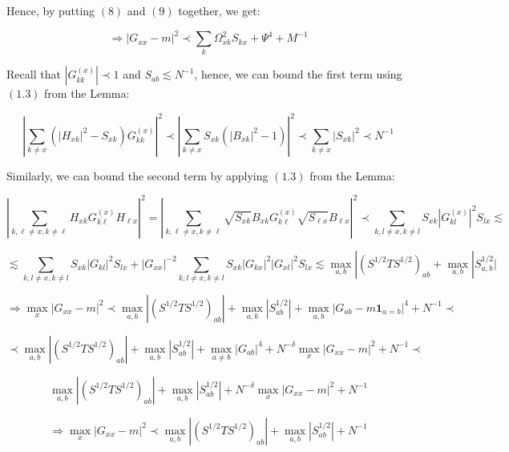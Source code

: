 \documentclass[11pt]{article}
\begin{document}
Hence, by putting $(8)$ and $(9)$ together, we get:

\begin{equation*}\Rightarrow |G_{xx}-m|^2\prec \sum_{k}\Omega_{xk}^2S_{kx}+\Psi^4 + M^{-1}\tag{10}\end{equation*}

Recall that $|G_{kk}^{(x)}|\prec 1$ and $S_{ab}\lesssim N^{-1}$, hence, we can bound the first term using $(1.3)$ from the Lemma:

$$\left\vert\sum_{k\neq x}(|H_{xk}|^2-S_{xk})G_{kk}^{(x)}\right\vert^2\prec\left\vert\sum_{k\neq x}S_{xk}(|B_{xk}|^2-1)\right\vert^2 \prec  \sum_{k\neq x}|S_{xk}|^2\prec N^{-1}$$

Similarly, we can bound the second term by applying $(1.3)$ from the Lemma:

$$\left\vert\sum_{k, \ell\neq x, k\neq \ell}H_{xk}G_{k\ell}^{(x)}H_{\ell x}\right\vert^2 = \left\vert\sum_{k, \ell\neq x, k\neq \ell}\sqrt{S_{xk}}B_{xk}G_{k\ell}^{(x)}\sqrt{S_{\ell x}}B_{\ell x}\right\vert^2 \prec \sum_{k, l\neq x, k\neq l}S_{xk}|G_{kl}^{(x)}|^2S_{lx} \lesssim$$

$$\lesssim \sum_{k, l\neq x, k\neq l}S_{xk}|G_{kl}|^2S_{lx}+|G_{xx}|^{-2}\sum_{k, l\neq x, k\neq l}S_{xk}|G_{kx}|^2|G_{xl}|^2S_{lx}\lesssim \max_{a, b}|(S^{1/2}TS^{1/2})_{ab}+\max_{a, b}|S_{a, b}^{1/2}|$$

$$\Rightarrow \max_x|G_{xx}-m|^2\prec \max_{a, b}|(S^{1/2}TS^{1/2})_{ab}|+\max_{a, b}|S_{ab}^{1/2}|+\max_{a, b}|G_{ab}-m\mathbf{1}_{a=b}|^4+N^{-1}\prec$$

$$\prec \max_{a, b}|(S^{1/2}TS^{1/2})_{ab}|+\max_{a, b}|S_{ab}^{1/2}| +\max_{a\neq b}|G_{ab}|^4 + N^{-\delta}\max_x|G_{xx}-m|^2+N^{-1}\prec$$

$$ \max_{a, b}|(S^{1/2}TS^{1/2})_{ab}|+\max_{a, b}|S_{ab}^{1/2}|+N^{-\delta}\max_x|G_{xx}-m|^2+N^{-1}$$

$$\Rightarrow \max_x|G_{xx}-m|^2\prec \max_{a, b}|(S^{1/2}TS^{1/2})_{ab}|+\max_{a, b}|S_{ab}^{1/2}|+N^{-1}$$
\end{document}
